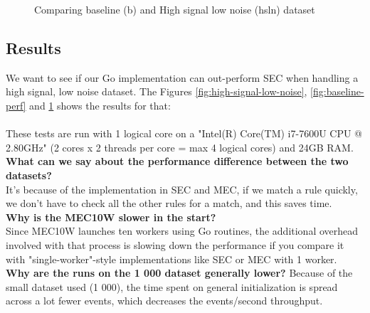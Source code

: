 \begin{figure}[ht]
\centering
{}
\caption{Comparing baseline (b) and High signal low noise (hsln) dataset}
\label{fig:comparing-perf}
\end{figure}

\subsection{Results}
We want to see if our Go implementation can out-perform SEC when handling a high signal, low noise dataset. The Figures \ref{fig:high-signal-low-noise}, \ref{fig:baseline-perf} and \ref{fig:comparing-perf} shows the results for that:
\\

\\
These tests are run with 1 logical core on a "Intel(R) Core(TM) i7-7600U CPU @ 2.80GHz" (2 cores x 2 threads per core = max 4 logical cores) and 24GB RAM.\\
\textbf{What can we say about the performance difference between the two datasets?}\\
It's because of the implementation in SEC and MEC, if we match a rule quickly, we don't have to check all the other rules for a match, and this saves time.\\
\textbf{Why is the MEC10W slower in the start?}\\
Since MEC10W launches ten workers using Go routines, the additional overhead involved with that process is slowing down the performance if you compare it with "single-worker"-style implementations like SEC or MEC with 1 worker.\\
\textbf{Why are the runs on the 1 000 dataset generally lower?}
Because of the small dataset used (1 000), the time spent on general initialization is spread across a lot fewer events, which decreases the events/second throughput.

